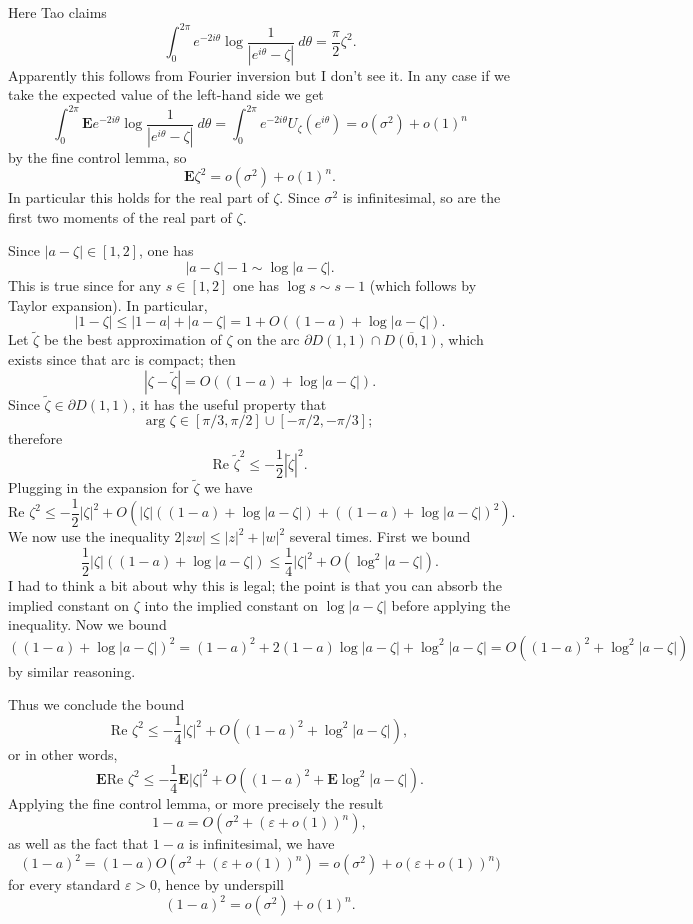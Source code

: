 \documentclass[12pt]{article}
\begin{document}
Here Tao claims
$$\int_0^{2\pi} e^{-2i\theta} \log \frac{1}{|e^{i\theta} - \zeta|} ~d\theta = \frac{\pi}{2}\zeta^2.$$
Apparently this follows from Fourier inversion but I don't see it.
In any case if we take the expected value of the left-hand side we get
$$\int_0^{2\pi} \mathbf Ee^{-2i\theta} \log \frac{1}{|e^{i\theta} - \zeta|} ~d\theta = \int_0^{2\pi} e^{-2i\theta} U_\zeta(e^{i\theta}) = o(\sigma^2) + o(1)^n$$
by the fine control lemma, so
$$\mathbf E \zeta^2 = o(\sigma^2) + o(1)^n.$$
In particular this holds for the real part of $\zeta$.
Since $\sigma^2$ is infinitesimal, so are the first two moments of the real part of $\zeta$.

Since $|a - \zeta| \in [1, 2]$, one has
$$|a - \zeta| - 1 \sim \log |a - \zeta|.$$
This is true since for any $s \in [1, 2]$ one has $\log s \sim s - 1$ (which follows by Taylor expansion).
In particular,
$$|1 - \zeta| \leq |1 - a| + |a - \zeta| = 1 + O((1 - a) + \log |a - \zeta|).$$
Let $\tilde \zeta$ be the best approximation of $\zeta$ on the arc $\partial D(1, 1) \cap \overline{D(0, 1)}$, which exists since that arc is compact; then
$$|\zeta - \tilde \zeta| = O((1 - a) + \log|a - \zeta|).$$
Since $\tilde \zeta \in \partial D(1, 1)$, it has the useful property that
$$\text{arg }\zeta \in [\pi/3,\pi/2] \cup [-\pi/2, -\pi/3];$$
therefore
$$\text{Re } \tilde \zeta^2 \leq -\frac{1}{2} |\tilde \zeta|^2.$$
Plugging in the expansion for $\tilde \zeta$ we have
$$\text{Re } \zeta^2 \leq -\frac{1}{2} |\zeta|^2 + O(|\zeta|((1-a) + \log|a -\zeta|) + ((1 - a) + \log|a - \zeta|)^2).$$
We now use the inequality $2|zw| \leq |z|^2 + |w|^2$ several times. First we bound
$$\frac{1}{2} |\zeta|((1-a) + \log|a -\zeta|) \leq \frac{1}{4}|\zeta|^2 + O(\log^2 |a - \zeta|).$$
I had to think a bit about why this is legal; the point is that you can absorb the implied constant on $\zeta$ into the implied constant on $\log |a - \zeta|$ before applying the inequality.
Now we bound
$$((1 - a) + \log|a - \zeta|)^2 = (1 - a)^2 + 2(1 - a)\log|a - \zeta| + \log^2 |a - \zeta| = O((1-a)^2 + \log^2 |a - \zeta|)$$
by similar reasoning.

Thus we conclude the bound
$$\text{Re } \zeta^2 \leq - \frac{1}{4} |\zeta|^2 + O((1-a)^2 + \log^2 |a - \zeta|),$$
or in other words,
$$\mathbf E \text{Re }\zeta^2 \leq -\frac{1}{4} \mathbf E |\zeta|^2 + O((1-a)^2+ \mathbf E \log^2 |a - \zeta|).$$
Applying the fine control lemma, or more precisely the result
$$1 - a = O(\sigma^2 + (\varepsilon + o(1))^n),$$
as well as the fact that $1 - a$ is infinitesimal, we have
$$(1-a)^2 = (1 - a) O(\sigma^2 + (\varepsilon + o(1))^n) = o(\sigma^2) + o(\varepsilon + o(1))^n)$$
for every standard $\varepsilon > 0$, hence by underspill
$$(1-a)^2 = o(\sigma^2) + o(1)^n.$$
\end{document}
